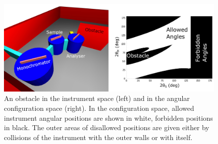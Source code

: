 \begin{figure}[htb]
	\centering
	\includegraphics[width = 0.95 \textwidth]{figures/tas_wall.jpg}
	\caption{An obstacle in the instrument space (left) and in the angular configuration space (right). In the configuration
		space, allowed instrument angular positions are shown in white, forbidden positions in black. The outer areas
		of disallowed positions are given either by collisions of the instrument with the outer walls or with itself.}
	\label{fig:tas_wall}
\end{figure}
